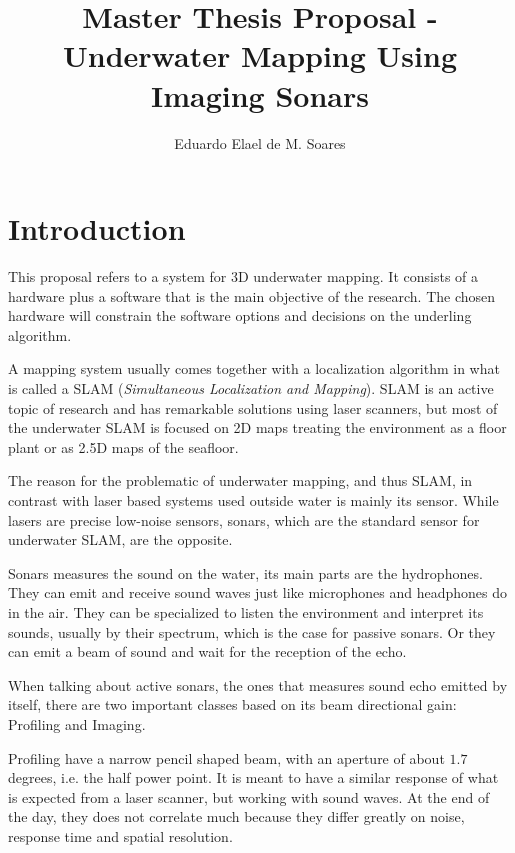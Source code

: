 \documentclass{article}
\begin{document}
\nobibliography*

\title{Master Thesis Proposal - Underwater Mapping Using Imaging Sonars}
\author{Eduardo Elael de M. Soares}

\maketitle
\tableofcontents

\section{Introduction}

This proposal refers to a system for 3D underwater mapping. It consists of a
hardware plus a software that is the main objective of the research. The
chosen hardware will constrain the software options and decisions on the
underling algorithm.

A mapping system usually comes together with a localization algorithm in what is
called a SLAM (\textit{Simultaneous Localization and Mapping}). SLAM is an
active topic of research and has remarkable solutions using laser scanners,
but most of the underwater SLAM is focused on 2D maps treating the environment
as a floor plant or as 2.5D maps of the seafloor.

The reason for the problematic of underwater mapping, and thus SLAM, in contrast
with laser based systems used outside water is mainly its sensor. While lasers
are precise low-noise sensors, sonars, which are the standard sensor for
underwater SLAM, are the opposite.

Sonars measures the sound on the water, its main parts are the hydrophones. They
can emit and receive sound waves just like microphones and headphones do in the
air. They can be specialized to listen the environment and interpret its sounds,
usually by their spectrum, which is the case for passive sonars. Or they can
emit a beam of sound and wait for the reception of the echo.

 When talking about active sonars, the ones that measures sound echo emitted
by itself, there are two important classes based on its beam directional gain:
Profiling and Imaging.

Profiling have a narrow pencil shaped beam, with an aperture of about $1.7$
degrees, i.e. the half power point. It is meant to have a similar response of
what is expected from a laser scanner, but working with sound waves. At the end
of the day, they does not correlate much because they differ greatly on noise,
response time and spatial resolution.
\end{document}
